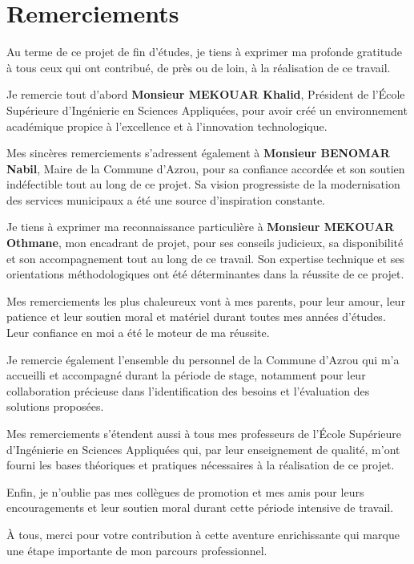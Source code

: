 \chapter*{Remerciements}

Au terme de ce projet de fin d'études, je tiens à exprimer ma profonde gratitude à tous ceux qui ont contribué, de près ou de loin, à la réalisation de ce travail.

Je remercie tout d'abord \textbf{Monsieur MEKOUAR Khalid}, Président de l'École Supérieure d'Ingénierie en Sciences Appliquées, pour avoir créé un environnement académique propice à l'excellence et à l'innovation technologique.

Mes sincères remerciements s'adressent également à \textbf{Monsieur BENOMAR Nabil}, Maire de la Commune d'Azrou, pour sa confiance accordée et son soutien indéfectible tout au long de ce projet. Sa vision progressiste de la modernisation des services municipaux a été une source d'inspiration constante.

Je tiens à exprimer ma reconnaissance particulière à \textbf{Monsieur MEKOUAR Othmane}, mon encadrant de projet, pour ses conseils judicieux, sa disponibilité et son accompagnement tout au long de ce travail. Son expertise technique et ses orientations méthodologiques ont été déterminantes dans la réussite de ce projet.

Mes remerciements les plus chaleureux vont à mes parents, pour leur amour, leur patience et leur soutien moral et matériel durant toutes mes années d'études. Leur confiance en moi a été le moteur de ma réussite.

Je remercie également l'ensemble du personnel de la Commune d'Azrou qui m'a accueilli et accompagné durant la période de stage, notamment pour leur collaboration précieuse dans l'identification des besoins et l'évaluation des solutions proposées.

Mes remerciements s'étendent aussi à tous mes professeurs de l'École Supérieure d'Ingénierie en Sciences Appliquées qui, par leur enseignement de qualité, m'ont fourni les bases théoriques et pratiques nécessaires à la réalisation de ce projet.

Enfin, je n'oublie pas mes collègues de promotion et mes amis pour leurs encouragements et leur soutien moral durant cette période intensive de travail.

À tous, merci pour votre contribution à cette aventure enrichissante qui marque une étape importante de mon parcours professionnel.

